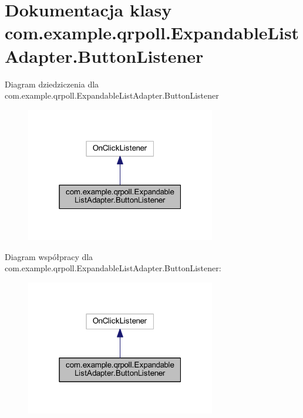 \hypertarget{classcom_1_1example_1_1qrpoll_1_1_expandable_list_adapter_1_1_button_listener}{\section{Dokumentacja klasy com.\+example.\+qrpoll.\+Expandable\+List\+Adapter.\+Button\+Listener}
\label{classcom_1_1example_1_1qrpoll_1_1_expandable_list_adapter_1_1_button_listener}
}


Diagram dziedziczenia dla com.\+example.\+qrpoll.\+Expandable\+List\+Adapter.\+Button\+Listener
\nopagebreak
\begin{figure}[H]
\begin{center}
\leavevmode
\includegraphics[width=235pt]{classcom_1_1example_1_1qrpoll_1_1_expandable_list_adapter_1_1_button_listener__inherit__graph}
\end{center}
\end{figure}


Diagram współpracy dla com.\+example.\+qrpoll.\+Expandable\+List\+Adapter.\+Button\+Listener\+:
\nopagebreak
\begin{figure}[H]
\begin{center}
\leavevmode
\includegraphics[width=235pt]{classcom_1_1example_1_1qrpoll_1_1_expandable_list_adapter_1_1_button_listener__coll__graph}
\end{center}
\end{figure}
